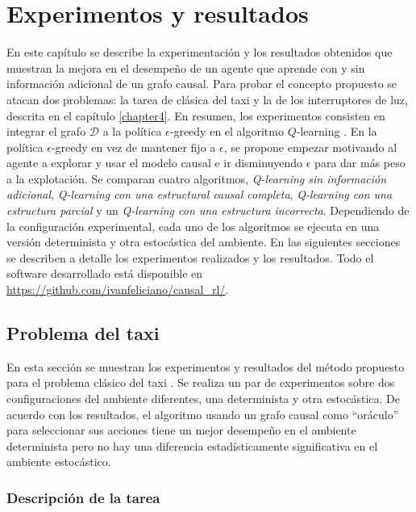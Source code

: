 \chapter{Experimentos y resultados}\label{chapter5}

\graphicspath{{Chapter5/Figs/}}


En este capítulo se describe la experimentación y los resultados obtenidos
que muestran la mejora en el desempeño de un agente que aprende
con y sin información adicional de un grafo causal.
Para probar el concepto propuesto se atacan dos problemas: la tarea de clásica del taxi \cite{Dietterich:2000:HRL:1622262.1622268} y la de los
interruptores de luz, descrita en el capítulo \ref{chapter4}.
En resumen, los experimentos consisten en integrar el grafo $\mathcal{D}$ a la política $\epsilon$-greedy
en el algoritmo $Q$-learning \cite{watkins1992q}.
En la política $\epsilon$-greedy en vez de mantener fijo a $\epsilon$, se propone empezar motivando al agente a explorar y usar
el modelo causal e ir disminuyendo $\epsilon$ para dar más peso a la explotación.
Se comparan cuatro algoritmos, \textit{Q-learning sin información
adicional}, \textit{Q-learning con una estructural causal completa}, \textit{Q-learning con una estructura parcial} y un \textit{Q-learning con una estructura incorrecta}.
Dependiendo de la configuración experimental, cada uno de los algoritmos se ejecuta en una versión determinista y otra estocástica del ambiente. 
En las siguientes secciones se describen a detalle los experimentos realizados y los resultados. Todo el software desarrollado está 
disponible en \url{https://github.com/ivanfeliciano/causal_rl/}.


\section{Problema del taxi}

En esta sección se muestran los experimentos y resultados del método propuesto para el problema clásico del taxi \cite{Dietterich:2000:HRL:1622262.1622268}.
Se realiza un par de experimentos sobre dos configuraciones del ambiente diferentes,
una determinista y otra estocástica. De acuerdo con los resultados, 
el algoritmo usando un grafo causal como ``oráculo'' para seleccionar sus acciones
tiene un mejor desempeño en el ambiente determinista pero no hay una diferencia estadísticamente significativa en el ambiente estocástico.

\subsection{Descripción de la tarea}

